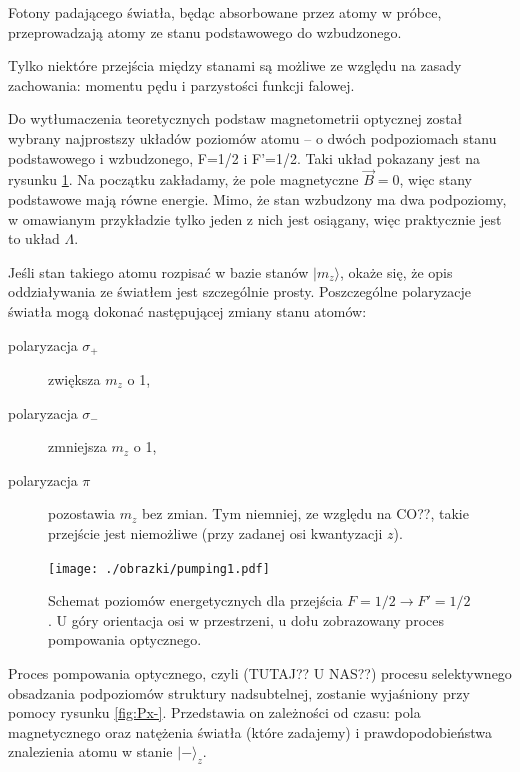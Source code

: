 \documentclass[a4paper,10pt,twoside]{report}
\begin{document}
Fotony padającego światła, będąc absorbowane przez atomy w próbce, przeprowadzają atomy ze stanu podstawowego do wzbudzonego.

Tylko niektóre przejścia między stanami są możliwe ze względu na zasady zachowania: momentu pędu i parzystości funkcji falowej. 

Do wytłumaczenia teoretycznych podstaw magnetometrii optycznej został wybrany najprostszy układów poziomów atomu -- o dwóch podpoziomach stanu podstawowego i wzbudzonego, F=1/2 i F'=1/2.
Taki układ pokazany jest na rysunku \ref{poziomyL}. Na początku zakładamy, że pole magnetyczne $\vec B=0$, więc stany podstawowe mają równe energie.
 Mimo, że stan wzbudzony ma dwa podpoziomy, w omawianym przykładzie tylko jeden z nich jest osiągany, więc praktycznie jest to układ $\Lambda$.

Jeśli stan takiego atomu rozpisać w bazie stanów $\lvert m_z \rangle$, okaże się, że opis oddziaływania ze światłem jest szczególnie prosty. Poszczególne polaryzacje światła mogą dokonać następującej zmiany stanu atomów:
\begin{center}
\begin{description}
\item[polaryzacja $\sigma_+$] zwiększa $m_z$ o 1,
\item[polaryzacja $\sigma_-$] zmniejsza $m_z$ o 1,
\item[polaryzacja $\pi$] pozostawia $m_z$ bez zmian. Tym niemniej, ze względu na CO??, takie przejście jest niemożliwe (przy zadanej osi kwantyzacji $z$).
\end{description}
\end{center}


\begin{figure}[h!]
\begin{center}
 \texttt{[image: ./obrazki/pumping1.pdf]}
\end{center}
\caption{ Schemat poziomów energetycznych dla przejścia $F=1/2 \rightarrow F'=1/2$. U góry orientacja osi w przestrzeni, u dołu zobrazowany proces pompowania optycznego.}
\label{poziomyL}
\end{figure}

Proces pompowania optycznego, czyli (TUTAJ?? U NAS??) procesu selektywnego obsadzania podpoziomów struktury nadsubtelnej, zostanie wyjaśniony przy pomocy rysunku \ref{fig:Px-}. Przedstawia on zależności od czasu: pola magnetycznego oraz natężenia światła (które zadajemy) i prawdopodobieństwa znalezienia atomu w stanie $\lvert - \rangle_z$.
\end{document}
